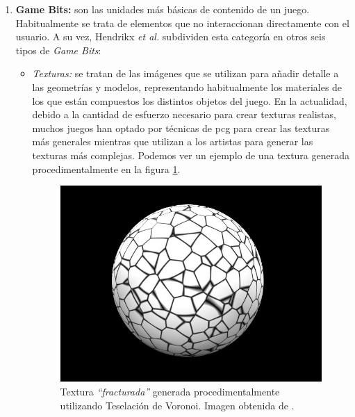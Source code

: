 \begin{enumerate}[label=(\alph*)]
    \item \textbf{Game Bits:} son las unidades más básicas de contenido de un juego. Habitualmente se trata de elementos que no interaccionan directamente con el usuario. A su vez, Hendrikx \textit{et al.} subdividen esta categoría en otros seis tipos de \textit{Game Bits}:
    
    \begin{itemize}
        \item \textit{Texturas:} se tratan de las imágenes que se utilizan para añadir detalle a las geometrías y modelos, representando habitualmente los materiales de los que están compuestos los distintos objetos del juego. En la actualidad, debido a la cantidad de esfuerzo necesario para crear texturas realistas, muchos juegos han optado por técnicas de \acrshort{pcg} para crear las texturas más generales mientras que utilizan a los artistas para generar las texturas más complejas. Podemos ver un ejemplo de una textura generada procedimentalmente en la figura \ref{fig:voronoi}.
        
        \begin{figure}[H]
            \begin{center}
                \includegraphics[scale=0.3]{img/Blender3D_VoronoiCrackle.jpg}
                \caption{Textura \textit{``fracturada''} generada procedimentalmente utilizando Teselación de Voronoi. Imagen obtenida de \cite{voronoi2007}.}
                \label{fig:voronoi}
            \end{center}
        \end{figure}
        

\end{itemize}
\end{enumerate}
